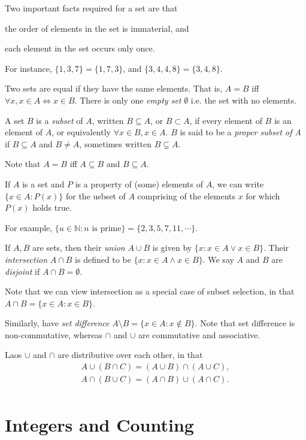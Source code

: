 \documentclass[12pt]{article}
\begin{document}
Two important facts required for a set are that 
\begin{compactenum}
\item the order of elements in the set is immaterial, and
\item each element in the set occurs only once.
\end{compactenum}

For instance, $\{1,3,7\} = \{1,7,3\}$, and $\{3,4,4,8\} = \{3,4,8\}$.

Two sets are equal if they have the same elements. 
That is, $A = B$ iff $\forall x, x \in A \iff x \in B$.
There is only one \emph{empty set} $\emptyset$ i.e. the set with no elements.

A set $B$ is a \emph{subset} of $A$, written $B \subseteq A$, or $B \subset A$,
if every element of $B$ is an element of $A$, or equivalently $\forall x \in B, x \in A$.
$B$ is said to be a \emph{proper subset of A} if $B \subseteq A$ and $B \ne A$,
sometimes written $B \subsetneq A$.

Note that $A = B$ iff $A \subseteq B$ and $B \subseteq A$.

If $A$ is a set and $P$ is a property of (some) elements of $A$,
we can write $\{x \in A : P(x)\}$ for the usbset of $A$ comprising
of the elements $x$ for which $P(x)$ holds true.

For example, $\{u \in \mathbb{N} : n\text{ is prime}\} = \{2,3,5,7,11,\cdots\}$.

If $A,B$ are sets, then their \emph{union} $A \cup B$ is
given by $\{x : x \in A \lor x \in B\}$.
Their \emph{intersection} $A \cap B$ is defined to be
$\{x : x \in A \land x \in B\}$.
We say $A$ and $B$ are \emph{disjoint} if $A \cap B = \emptyset$.

Note that we can view intersection as a special case of subset selection,
in that $A \cap B = \{x \in A : x \in B\}$.

Similarly, have \emph{set difference} $A \setminus B = \{x \in A : x \notin B\}$.
Note that set difference is non-commutative, whereas $\cap$ and $\cup$ 
are commutative and associative.

Laos $\cup$ and $\cap$ are distributive over each other, in that
\begin{align*}
    A \cup (B \cap C) = (A \cup B) \cap (A \cup C),\\
    A \cap (B \cup C) = (A \cap B) \cup (A \cap C).\\
\end{align*}

\section{Integers and Counting}
\end{document}
